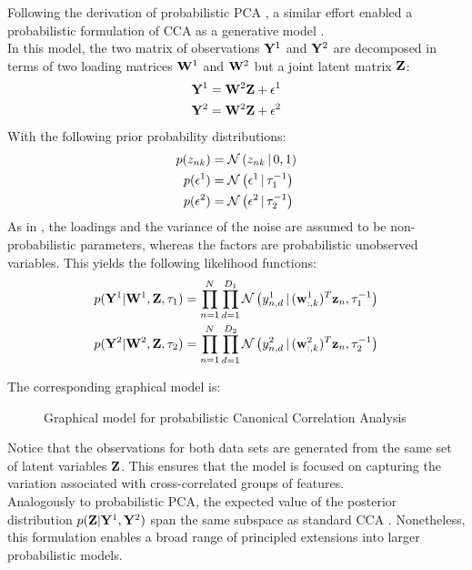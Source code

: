 Following the derivation of probabilistic PCA \cite{Tipping1999}, a similar effort enabled a probabilistic formulation of CCA as a generative model \cite{Bach2005}.\\
In this model, the two matrix of observations ${\bf Y}^{1}$ and ${\bf Y}^{2}$ are decomposed in terms of two loading matrices ${\bf W}^{1}$ and ${\bf W}^{2}$ but a joint latent matrix ${\bf Z}$:
\begin{align*}
	{\bf Y}^{1} &= {\bf W}^{2} {\bf Z} + \epsilon^{1} \\
	{\bf Y}^{2} &= {\bf W}^{2} {\bf Z} + \epsilon^{2}
\end{align*}
With the following prior probability distributions:
\begin{align*}
	p(z_{nk}) &= \mathcal{N}\left(z_{nk} \,|\, 0,1\right) \\
	p(\epsilon^{1}) &= \mathcal{N}\left(\epsilon^{1} \,|\, \tau_{1}^{-1}\right) \\
	p(\epsilon^{2}) &= \mathcal{N}\left(\epsilon^{2} \,|\, \tau_{2}^{-1}\right)
\end{align*}
As in \cite{Tipping1999}, the loadings and the variance of the noise are assumed to be non-probabilistic parameters, whereas the factors are probabilistic unobserved variables. This yields the following likelihood functions:
\begin{align} \label{eq:probabilistic_cca_likelihood}
	p({\bf Y}^{1}|{\bf W}^{1},{\bf Z},\tau_{1}) &= \prod_{n=1}^{N} \prod_{d=1}^{D_1} \mathcal{N}\left(y^{1}_{n,d} \,|\, ({\bf w}_{:,k}^{1})^T {\bf z}_{n},\tau_{1}^{-1}\right) \\
	p({\bf Y}^{2}|{\bf W}^{2},{\bf Z},\tau_{2}) &= \prod_{n=1}^{N} \prod_{d=1}^{D_2} \mathcal{N}\left(y^{2}_{n,d} \,|\, ({\bf w}_{:,k}^{2})^T {\bf z}_{n},\tau_{2}^{-1}\right) \nonumber
\end{align}

The corresponding graphical model is:

\begin{figure}[H] \begin{center}
	
	\label{fig:graphical_CCA}
	\caption{Graphical model for probabilistic Canonical Correlation Analysis}
\end{center} \end{figure}

Notice that the observations for both data sets are generated from the same set of latent variables ${\bf Z}$. This ensures that the model is focused on capturing the variation associated with cross-correlated groups of features.\\
Analogously to probabilistic PCA, the expected value of the posterior distribution $p({\bf Z}|{\bf Y}^{1},{\bf Y}^{2})$ span the same subspace as standard CCA \cite{Bach2005}. Nonetheless, this formulation enables a broad range of principled extensions into larger probabilistic models.


